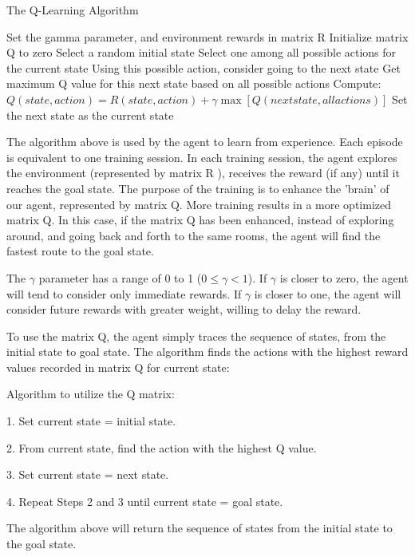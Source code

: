 \documentclass[a4paper, 11pt]{article}
\begin{document}
  \begin{algorithm}
%
     \caption{The Q-Learning Algorithm}
       Set the gamma parameter, and environment rewards in matrix R\;
        Initialize matrix Q to zero\;
        {
            Select a random initial state\;
            {
                Select one among all possible actions for the current state\;
				Using this possible action, consider going to the next state\;
				Get maximum Q value for this next state based on all possible actions\;
				Compute: $Q(state, action) = R(state, action) + \gamma\max[Q(next state, all actions)]$\;
				Set the next state as the current state\;
            }
        }

    \end{algorithm}

The algorithm above is used by the agent to learn from experience.  Each episode is equivalent to one training session.  In each training session, the agent explores the environment (represented by matrix R ), receives the reward (if any) until it reaches the goal state. The purpose of the training is to enhance the 'brain' of our agent, represented by matrix Q.  More training results in a more optimized matrix Q.  In this case, if the matrix Q has been enhanced, instead of exploring around, and going back and forth to the same rooms, the agent will find the fastest route to the goal state.

The $\gamma$ parameter has a range of 0 to 1 ($0\leq\gamma<1$).  If $\gamma$ is closer to zero, the agent will tend to consider only immediate rewards.  If $\gamma$ is closer to one, the agent will consider future rewards with greater weight, willing to delay the reward.

To use the matrix Q, the agent simply traces the sequence of states, from the initial state to goal state.  The algorithm finds the actions with the highest reward values recorded in matrix Q for current state:

Algorithm to utilize the Q matrix:

1. Set current state = initial state.

2. From current state, find the action with the highest Q value.

3. Set current state = next state.

4. Repeat Steps 2 and 3 until current state = goal state.

The algorithm above will return the sequence of states from the initial state to the goal state.
\end{document}

